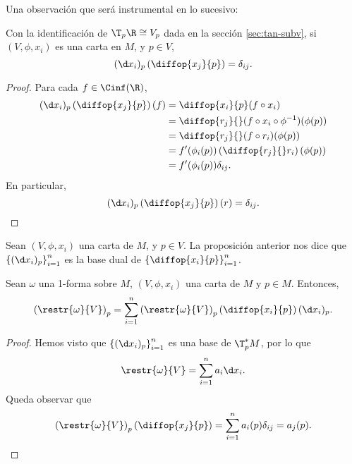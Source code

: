 Una observación que será instrumental en lo sucesivo:
\begin{nprop}
  Con la identificación de $\T_{p}\R \cong V_{p}$ dada en la sección
  \ref{sec:tan-subv}, si $(V,\phi,x_{i})$ es una carta en $M$, y $p\in V$,
  \[
    (\d x_{i})_{p}\left( \diffop{x_{j}}{p} \right) = \delta_{ij}
  .\]
\end{nprop}
\begin{proof}
  Para cada $f\in\Cinf(\R)$,
  \begin{align*}
    (\d x_{i})_{p}\left( \diffop{x_{j}}{p} \right)(f) & = \diffop{x_{i}}{p}(f\circ
                                                     x_{i}) \\
                                                   & = \diffop{r_{j}}{}(f\circ
                                                     x_{i}\circ
                                                     \phi^{-1})(\phi(p)) \\
                                                   & = \diffop{r_{j}}{} (f\circ
                                                     r_{i})(\phi(p)) \\
                                                   & = f'(\phi_{i}(p))
                                                     \left(\diffop{r_{j}}{}
                                                     r_{i}\right)(\phi(p)) \\
                                                   & = f'(\phi_{i}(p))\delta_{ij}.
  \end{align*}
  En particular,
  \[
   (\d x_{i})_{p}\left( \diffop{x_{j}}{p} \right)(r) = \delta_{ij}
  .\]
\end{proof}

\begin{ejemplo}
  Sean $(V,\phi,x_{i})$ una carta de $M$, y $p\in V$. La proposición anterior
  nos dice que $\left\{ (\d x_{i})_{p} \right\}_{i=1}^{n}$ es la base dual de $\left\{ \diffop{x_{i}}{p} \right\}_{i=1}^{n}$.
\end{ejemplo}

\begin{nprop}
  Sean $\omega$ una 1-forma sobre $M$, $(V,\phi,x_{i})$ una carta de $M$ y $p\in
  M$. Entonces,
  \[
    \left(\restr{\omega}{V}\right)_{p} = \sum_{i=1}^{n} \left( \restr{\omega}{V} \right)_{p}\left( \diffop{x_{i}}{p} \right) (\d x_{i})_{p}
  .\]
\end{nprop}
\begin{proof}
  Hemos visto que $\left\{ (\d x_{i})_{p} \right\}_{i=1}^{n}$ es una base de
  $\T_{p}^{*}M$, por lo que
  \[
    \restr{\omega}{V} = \sum_{i=1}^{n}a_{i}\d x_{i}
    .\]
  Queda observar que
  \[
    \left(\restr{\omega}{V}\right)_{p}\left( \diffop{x_{j}}{p} \right) =
    \sum_{i=1}^{n}a_{i}(p)\delta_{ij} = a_{j}(p)
  .\]
\end{proof}

